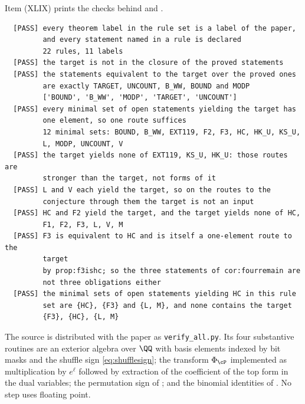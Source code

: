 Item (XLIX) prints the checks behind  and
.

\begin{small}
\begin{verbatim}
  [PASS] every theorem label in the rule set is a label of the paper,
         and every statement named in a rule is declared
         22 rules, 11 labels
  [PASS] the target is not in the closure of the proved statements
  [PASS] the statements equivalent to the target over the proved ones
         are exactly TARGET, UNCOUNT, B_WW, BOUND and MODP
         ['BOUND', 'B_WW', 'MODP', 'TARGET', 'UNCOUNT']
  [PASS] every minimal set of open statements yielding the target has
         one element, so one route suffices
         12 minimal sets: BOUND, B_WW, EXT119, F2, F3, HC, HK_U, KS_U,
         L, MODP, UNCOUNT, V
  [PASS] the target yields none of EXT119, KS_U, HK_U: those routes are
         stronger than the target, not forms of it
  [PASS] L and V each yield the target, so on the routes to the
         conjecture through them the target is not an input
  [PASS] HC and F2 yield the target, and the target yields none of HC,
         F1, F2, F3, L, V, M
  [PASS] F3 is equivalent to HC and is itself a one-element route to the
         target
         by prop:f3ishc; so the three statements of cor:fourremain are
         not three obligations either
  [PASS] the minimal sets of open statements yielding HC in this rule
         set are {HC}, {F3} and {L, M}, and none contains the target
         {F3}, {HC}, {L, M}
\end{verbatim}
\end{small}

The source is distributed with the paper as \texttt{verify\_all.py}. Its four
substantive routines are an exterior algebra over $\QQ$ with basis elements
indexed by bit masks and the shuffle sign \eqref{eq:shufflesign}; the
transform $\Phi_{\cP}$ implemented as multiplication by $e^{\ell}$ followed by
extraction of the coefficient of the top form in the dual variables; the
permutation sign of ; and the binomial identities of
. No step uses floating point.
